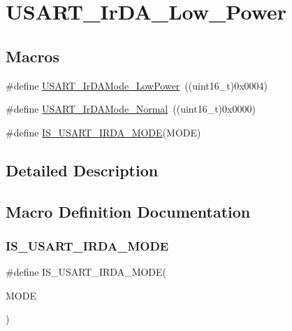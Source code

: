 \hypertarget{group___u_s_a_r_t___ir_d_a___low___power}{}\section{U\+S\+A\+R\+T\+\_\+\+Ir\+D\+A\+\_\+\+Low\+\_\+\+Power}
\label{group___u_s_a_r_t___ir_d_a___low___power}
\subsection*{Macros}
\begin{DoxyCompactItemize}
\item 
\#define \mbox{\hyperlink{group___u_s_a_r_t___ir_d_a___low___power_ga00c2635d0e6ca1a5b158f1c1673e862f}{U\+S\+A\+R\+T\+\_\+\+Ir\+D\+A\+Mode\+\_\+\+Low\+Power}}~((uint16\+\_\+t)0x0004)
\item 
\#define \mbox{\hyperlink{group___u_s_a_r_t___ir_d_a___low___power_ga796cd5451deb896741206986bd6d03e6}{U\+S\+A\+R\+T\+\_\+\+Ir\+D\+A\+Mode\+\_\+\+Normal}}~((uint16\+\_\+t)0x0000)
\item 
\#define \mbox{\hyperlink{group___u_s_a_r_t___ir_d_a___low___power_ga7790838ff8ee71089da2c0e5bceee569}{I\+S\+\_\+\+U\+S\+A\+R\+T\+\_\+\+I\+R\+D\+A\+\_\+\+M\+O\+DE}}(M\+O\+DE)
\end{DoxyCompactItemize}


\subsection{Detailed Description}


\subsection{Macro Definition Documentation}
\mbox{\label{group___u_s_a_r_t___ir_d_a___low___power_ga7790838ff8ee71089da2c0e5bceee569}} 
\subsubsection{\texorpdfstring{IS\_USART\_IRDA\_MODE}{IS\_USART\_IRDA\_MODE}}
{\footnotesize\ttfamily \#define I\+S\+\_\+\+U\+S\+A\+R\+T\+\_\+\+I\+R\+D\+A\+\_\+\+M\+O\+DE(\begin{DoxyParamCaption}\item[{}]{M\+O\+DE }\end{DoxyParamCaption})}

